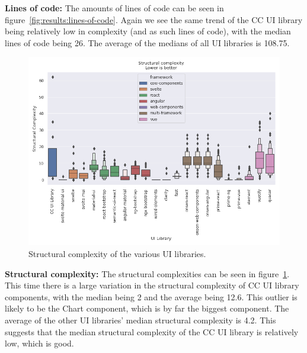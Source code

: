 \textbf{Lines of code:} The amounts of lines of code can be seen in figure~\ref{fig:results:lines-of-code}. Again we see the same trend of the CC UI library being relatively low in complexity (and as such lines of code), with the median lines of code being 26. The average of the medians of all UI libraries is 108.75.

\begin{figure}[h]
  \includegraphics[width=\columnwidth]{plots/structural-complexity.png}
  \caption{Structural complexity of the various UI libraries.}
  \label{fig:results:structural-complexity}
  \centering
\end{figure}

\textbf{Structural complexity:} The structural complexities can be seen in figure~\ref{fig:results:structural-complexity}. This time there is a large variation in the structural complexity of CC UI library components, with the median being 2 and the average being 12.6. This outlier is likely to be the Chart component, which is by far the biggest component. The average of the other UI libraries' median structural complexity is 4.2. This suggests that the median structural complexity of the CC UI library is relatively low, which is good.

